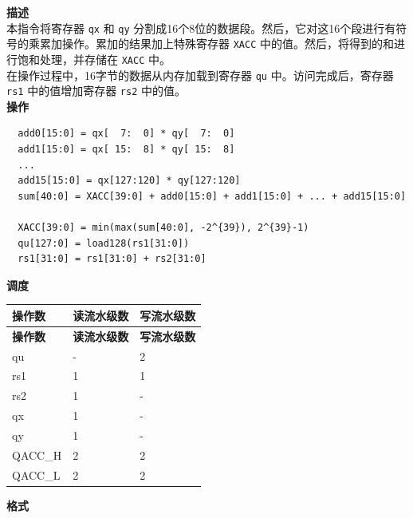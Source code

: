\textbf{描述}\\

本指令将寄存器 \lstinline{qx} 和 \lstinline{qy} 分割成16个8位的数据段。然后，它对这16个段进行有符号的乘累加操作。累加的结果加上特殊寄存器 \lstinline{XACC} 中的值。然后，将得到的和进行饱和处理，并存储在 \lstinline{XACC} 中。\\ 在操作过程中，16字节的数据从内存加载到寄存器 \lstinline{qu} 中。访问完成后，寄存器 \lstinline{rs1} 中的值增加寄存器 \lstinline{rs2} 中的值。\\
\textbf{操作}
\begin{lstlisting}
  add0[15:0] = qx[  7:  0] * qy[  7:  0]
  add1[15:0] = qx[ 15:  8] * qy[ 15:  8]
  ...
  add15[15:0] = qx[127:120] * qy[127:120]
  sum[40:0] = XACC[39:0] + add0[15:0] + add1[15:0] + ... + add15[15:0]

  XACC[39:0] = min(max(sum[40:0], -2^{39}), 2^{39}-1)
  qu[127:0] = load128(rs1[31:0])
  rs1[31:0] = rs1[31:0] + rs2[31:0]
\end{lstlisting}

\textbf{调度}\\
\begin{longtable}[c]{|l|l|l|}
    \hline
    \rowcolor{lightgray}
    \textbf{操作数} & \textbf{读流水级数} & \textbf{写流水级数} \\\hline
    \endfirsthead
    \hline
    \rowcolor{lightgray}
     \textbf{操作数} & \textbf{读流水级数} & \textbf{写流水级数} \\\hline
    \endhead
    \hline
    \endfoot

    qu & - & 2 \\\hline
    rs1 & 1 & 1 \\\hline
    rs2 & 1 & - \\\hline
     qx & 1 & - \\\hline
     qy & 1 & - \\\hline
     QACC\_H & 2 & 2 \\\hline
     QACC\_L & 2 & 2

\end{longtable}

\textbf{格式}\\

